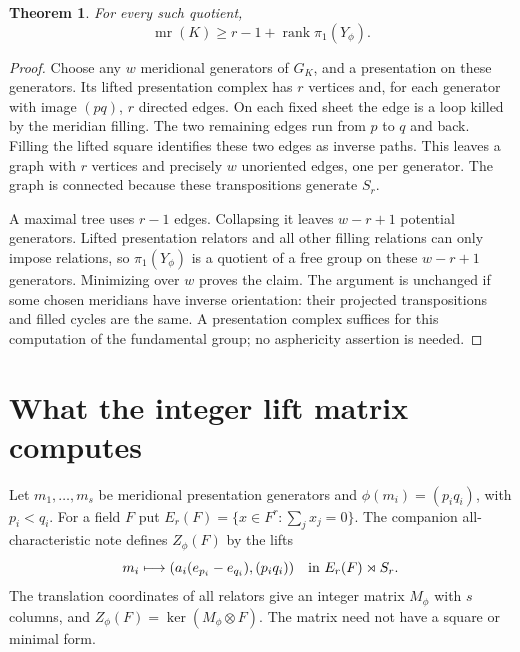 \documentclass[11pt]{article}
\newtheorem{theorem}{Theorem}
\newcommand{\mr}{\operatorname{mr}}
\newcommand{\rk}{\operatorname{rank}}
\begin{document}
\begin{theorem}\label{thm:group}
For every such quotient,
\[
                     \mr(K)\ge r-1+\rk\pi_1(Y_\phi).
\]
\end{theorem}
\begin{proof}
Choose any $w$ meridional generators of $G_K$, and a presentation on
these generators. Its lifted presentation complex has $r$ vertices
and, for each generator with image $(pq)$, $r$ directed edges. On each
fixed sheet the edge is a loop killed by the meridian filling. The two
remaining edges run from $p$ to $q$ and back. Filling the lifted square
identifies these two edges as inverse paths. This leaves a graph with
$r$ vertices and precisely $w$ unoriented edges, one per generator.
The graph is connected because these transpositions generate $S_r$.

A maximal tree uses $r-1$ edges. Collapsing it leaves $w-r+1$ potential
generators. Lifted presentation relators and all other filling relations
can only impose relations, so $\pi_1(Y_\phi)$ is a quotient of a free
group on these $w-r+1$ generators. Minimizing over $w$ proves the claim.
The argument is unchanged if some chosen meridians have inverse
orientation: their projected transpositions and filled cycles are the
same. A presentation complex suffices for this computation of the
fundamental group; no asphericity assertion is needed.
\end{proof}

\section{What the integer lift matrix computes}

Let $m_1,\ldots,m_s$ be meridional presentation generators and
$\phi(m_i)=(p_iq_i)$, with $p_i<q_i$. For a field $F$ put
$E_r(F)=\{x\in F^r:\sum_jx_j=0\}$. The companion all-characteristic
note defines $Z_\phi(F)$ by the lifts
\[
 m_i\longmapsto (a_i(e_{p_i}-e_{q_i}),(p_iq_i))
                       \quad\hbox{in }E_r(F)\rtimes S_r.
\]
The translation coordinates of all relators give an integer matrix
$M_\phi$ with $s$ columns, and $Z_\phi(F)=\ker(M_\phi\otimes F)$.
The matrix need not have a square or minimal form.
\end{document}
